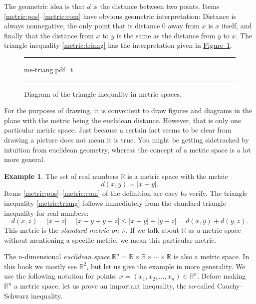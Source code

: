 \documentclass[12pt,openany]{book}
\newcommand{\abs}[1]{\left\lvert {#1} \right\rvert}
\newcommand{\R}{{\mathbb{R}}}
\newcommand{\myindex}[1]{#1\index{#1}}
\theoremstyle{plain}
\theoremstyle{remark}
\theoremstyle{definition}
\newenvironment{myfig}{%
\begin{figure}[h!t]
\noindent\rule{\textwidth}{0.4pt}\vspace{12pt}\par\centering}%
{\par\noindent\rule{\textwidth}{0.4pt}
\end{figure}}
\theoremstyle{exercise}
\theoremstyle{example}
\newtheorem{example}[thm]{Example}
\newcommand{\figureref}[1]{\hyperref[#1]{Figure~\ref*{#1}}}
\begin{document}
The geometric idea is that $d$ is the distance between two points. 
Items \ref{metric:pos}--\ref{metric:com} have obvious geometric
interpretation: Distance is always nonnegative, the only point that is
distance 0 away from $x$ is $x$ itself, and finally that the distance from
$x$ to $y$ is the same as the distance from $y$ to $x$.  The triangle
inequality \ref{metric:triang} has the interpretation given in
\figureref{fig:mstriang}.
\begin{myfig}
{ms-triang.pdf_t}
\caption{Diagram of the triangle inequality in metric spaces.\label{fig:mstriang}}
\end{myfig}

For the purposes of drawing, it is convenient to draw figures and
diagrams in the plane with the metric being the euclidean distance.
However, that is only one particular metric space.  Just because a
certain fact seems to be clear from drawing a picture does not mean it is
true.  You might be getting sidetracked by intuition from euclidean
geometry,
whereas the concept of a metric space is a lot more general.

\begin{example}
The set of real numbers $\R$ is a metric space with the metric
\begin{equation*}
d(x,y) = \abs{x-y} .
\end{equation*}
Items \ref{metric:pos}--\ref{metric:com} of the definition
are easy to verify.  The
triangle inequality \ref{metric:triang} follows immediately
from the standard triangle inequality for real numbers:
\begin{equation*}
d(x,z) = \abs{x-z} = 
\abs{x-y+y-z} \leq
\abs{x-y}+\abs{y-z} =
d(x,y)+ d(y,z) .
\end{equation*}
This metric is the \emph{\myindex{standard metric on $\R$}}.  If we talk
about $\R$ as a metric space without mentioning a specific metric, we 
mean this particular metric.
\end{example}

The 
$n$-dimensional \emph{\myindex{euclidean space}}
$\R^n = \R \times \R \times \cdots \times \R$ is also a metric space.
In this book
we mostly see $\R^2$, but let us give the example in more generality.
We use the following
notation for points: $x =(x_1,x_2,\ldots,x_n) \in \R^n$.
Before making $\R^n$ a metric space, let us prove an important inequality, the
so-called Cauchy--Schwarz inequality.
\end{document}
